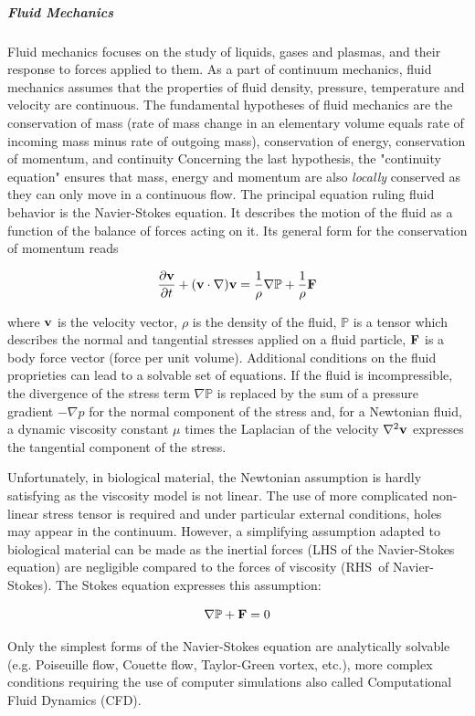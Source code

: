 \subparagraph{Fluid Mechanics}


Fluid mechanics focuses on the study of liquids, gases and plasmas, and their response to forces applied to them. As a part of continuum mechanics, fluid mechanics assumes that the properties of fluid density, pressure, temperature and velocity are continuous. The fundamental hypotheses of fluid mechanics are the conservation of mass (rate of mass change in an elementary volume equals rate of incoming mass minus rate of outgoing mass), conservation of energy, conservation of momentum, and continuity Concerning the last hypothesis, the "continuity equation" ensures that mass, energy and momentum are also \textit{locally} conserved as they can only move in a continuous flow. The principal equation ruling fluid behavior is the Navier-Stokes equation. It describes the motion of the fluid as a function of the balance of forces acting on it. Its general form for the conservation of momentum reads

$${\partial{\bf v}\over{\partial t}} + ({\bf v} \cdot \nabla) {\bf v} = {1\over\rho} \nabla \mathbb{P} + {1\over\rho} {\bf F}$$

where ${\bf v}$ is the velocity vector, $\rho$ is the density of the fluid, $\mathbb{P}$ is a tensor which describes the normal and tangential stresses applied on a fluid particle, ${\bf F}$ is a body force vector (force per unit volume). Additional conditions on the fluid proprieties can lead to a solvable set of equations. If the fluid is incompressible, the divergence of the stress term $\nabla \mathbb{P}$ is replaced by the sum of a pressure gradient $- \nabla p$ for the normal component of the stress and, for a Newtonian fluid, a dynamic viscosity constant $\mu$ times the Laplacian of the velocity $\nabla^2{\bf v}$ expresses the tangential component of the stress.

Unfortunately, in biological material, the Newtonian assumption is hardly satisfying as the viscosity model is not linear. The use of more complicated non-linear stress tensor is required and under particular external conditions, holes may appear in the continuum. However, a simplifying assumption adapted to biological material can be made as the inertial forces (LHS of the Navier-Stokes equation) are negligible compared to the forces of viscosity (RHS of Navier-Stokes). The Stokes equation expresses this assumption:

$$\nabla \mathbb{P} + {\bf F} = 0$$

Only the simplest forms of the Navier-Stokes equation are analytically solvable (e.g. Poiseuille flow, Couette flow, Taylor-Green vortex, etc.), more complex conditions requiring the use of computer simulations also called Computational Fluid Dynamics (CFD).

